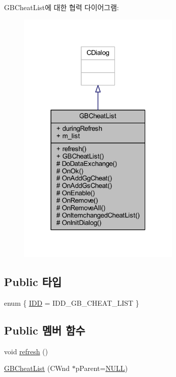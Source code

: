 G\+B\+Cheat\+List에 대한 협력 다이어그램\+:\nopagebreak
\begin{figure}[H]
\begin{center}
\leavevmode
\includegraphics[width=220pt]{class_g_b_cheat_list__coll__graph}
\end{center}
\end{figure}
\subsection*{Public 타입}
\begin{DoxyCompactItemize}
\item 
enum \{ \mbox{\hyperlink{class_g_b_cheat_list_acbd6ac83ab43510a2dcbab793ecb5fb8a984652944599dcf7e60131db4088f5a0}{I\+DD}} = I\+D\+D\+\_\+\+G\+B\+\_\+\+C\+H\+E\+A\+T\+\_\+\+L\+I\+ST
 \}
\end{DoxyCompactItemize}
\subsection*{Public 멤버 함수}
\begin{DoxyCompactItemize}
\item 
void \mbox{\hyperlink{class_g_b_cheat_list_a248cc28fa5e392d2f55d0f66ff6c5821}{refresh}} ()
\item 
\mbox{\hyperlink{class_g_b_cheat_list_a1eb2762c0143fad856fcf28086734c30}{G\+B\+Cheat\+List}} (C\+Wnd $\ast$p\+Parent=\mbox{\hyperlink{_system_8h_a070d2ce7b6bb7e5c05602aa8c308d0c4}{N\+U\+LL}})
\end{DoxyCompactItemize}
